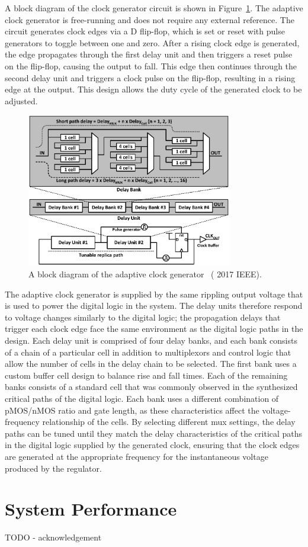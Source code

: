 \documentclass[graybox]{svmult}
\begin{document}
A block diagram of the clock generator circuit is shown in Figure~\ref{fig:3-clockgen}.
The adaptive clock generator is free-running and does not require any external reference.
The circuit generates clock edges via a D flip-flop, which is set or reset with pulse generators to toggle between one and zero.
After a rising clock edge is generated, the edge propagates through the first delay unit and then triggers a reset pulse on the flip-flop, causing the output to fall.
This edge then continues through the second delay unit and triggers a clock pulse on the flip-flop, resulting in a rising edge at the output.
This design allows the duty cycle of the generated clock to be adjusted.

\begin{figure}
  \centering
  \includegraphics[width=0.8\textwidth]{3-clockgen}
  \caption{A block diagram of the adaptive clock generator~\cite{Keller2017} ({\textcopyright} 2017 IEEE).}
  \label{fig:3-clockgen}
\end{figure}

The adaptive clock generator is supplied by the same rippling output voltage that is used to power the digital logic in the system.
The delay units therefore respond to voltage changes similarly to the digital logic; the propagation delays that trigger each clock edge face the same environment as the digital logic paths in the design.
Each delay unit is comprised of four delay banks, and each bank consists of a chain of a particular cell in addition to multiplexors and control logic that allow the number of cells in the delay chain to be selected.
The first bank uses a custom buffer cell design to balance rise and fall times.
Each of the remaining banks consists of a standard cell that was commonly observed in the synthesized critical paths of the digital logic.
Each bank uses a different combination of pMOS/nMOS ratio and gate length, as these characteristics affect the voltage-frequency relationship of the cells.
By selecting different mux settings, the delay paths can be tuned until they match the delay characteristics of the critical paths in the digital logic supplied by the generated clock, ensuring that the clock edges are generated at the appropriate frequency for the instantaneous voltage produced by the regulator.

\section{System Performance}

\begin{acknowledgement}
TODO - acknowledgement
\end{acknowledgement}



\printbibliography
\end{document}
